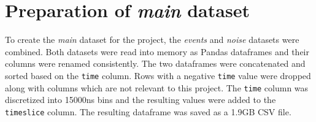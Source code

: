 \section{Preparation of \emph{main} dataset}%
\label{sec:data-prep-main}

To create the \emph{main} dataset for the project, the \emph{events} and
\emph{noise} datasets were combined. Both datasets were read into memory as
Pandas dataframes and their columns were renamed consistently. The two
dataframes were concatenated and sorted based on the \texttt{time} column. Rows
with a negative \texttt{time} value were dropped along with columns which are
not relevant to this project. The \texttt{time} column was discretized into
15000ns bins and the resulting values were added to the \texttt{timeslice}
column. The resulting dataframe was saved as a 1.9GB CSV file.

